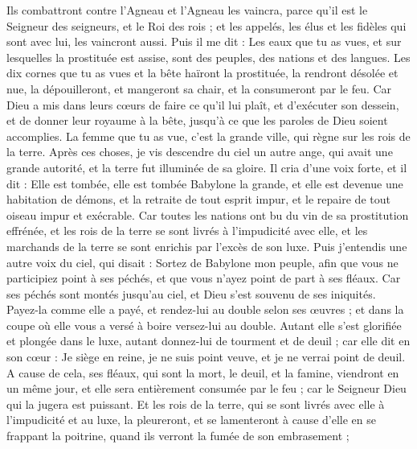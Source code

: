 \begin{multicols}{2}
Ils combattront contre l'Agneau et l'Agneau les vaincra, parce qu'il est le Seigneur des seigneurs, et le Roi des rois ; et les appelés, les élus et les fidèles qui sont avec lui, les vaincront aussi.
Puis il me dit : Les eaux que tu as vues, et sur lesquelles la prostituée est assise, sont des peuples, des nations et des langues.
Les dix cornes que tu as vues et la bête haïront la prostituée, la rendront désolée et nue, la dépouilleront, et mangeront sa chair, et la consumeront par le feu.
Car Dieu a mis dans leurs cœurs de faire ce qu'il lui plaît, et d’exécuter son dessein, et de donner leur royaume à la bête, jusqu'à ce que les paroles de Dieu soient accomplies.
La femme que tu as vue, c'est la grande ville, qui règne sur les rois de la terre.
\VerseOne{}Après ces choses, je vis descendre du ciel un autre ange, qui avait une grande autorité, et la terre fut illuminée de sa gloire.
Il cria d’une voix forte, et il dit : Elle est tombée, elle est tombée Babylone la grande, et elle est devenue une habitation de démons, et la retraite de tout esprit impur, et le repaire de tout oiseau impur et exécrable.
Car toutes les nations ont bu du vin de sa prostitution effrénée, et les rois de la terre se sont livrés à l’impudicité avec elle, et les marchands de la terre se sont enrichis par l'excès de son luxe.
Puis j'entendis une autre voix du ciel, qui disait : Sortez de Babylone mon peuple, afin que vous ne participiez point à ses péchés, et que vous n’ayez point de part à ses fléaux.
Car ses péchés sont montés jusqu'au ciel, et Dieu s'est souvenu de ses iniquités.
Payez-la comme elle a payé, et rendez-lui au double selon ses œuvres ; et dans la coupe où elle vous a versé à boire versez-lui au double.
Autant elle s'est glorifiée et plongée dans le luxe, autant donnez-lui de tourment et de deuil ; car elle dit en son cœur : Je siège en reine, je ne suis point veuve, et je ne verrai point de deuil.
A cause de cela, ses fléaux, qui sont la mort, le deuil, et la famine, viendront en un même jour, et elle sera entièrement consumée par le feu ; car le Seigneur Dieu qui la jugera est puissant.
Et les rois de la terre, qui se sont livrés avec elle à l’impudicité et au luxe, la pleureront, et se lamenteront à cause d’elle en se frappant la poitrine, quand ils verront la fumée de son embrasement ;

\end{multicols}
